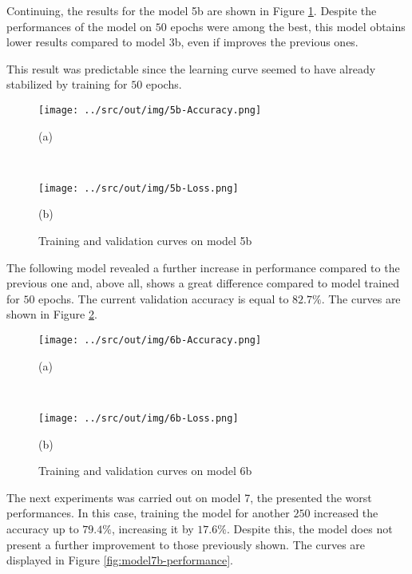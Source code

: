 \documentclass[a4paper,12pt]{article} %
\begin{document}
	Continuing, the results for the model 5b are shown in Figure 
	\ref{fig:model5b-performance}. Despite the performances of the model on 
	$50$ epochs were among the best, this model obtains lower results compared 
	to model 3b, even if improves the previous ones.
	
	This result was predictable since the learning curve seemed to have already 
	stabilized by training for $50$ epochs.
	
	\begin{figure}[htb]
		\begin{minipage}[c]{.49\textwidth}
			\centering
			\texttt{[image: ../src/out/img/5b-Accuracy.png]}
			\caption*{(a)}
		\end{minipage}
		~
		\begin{minipage}[c]{.49\textwidth}
			\centering
			\texttt{[image: ../src/out/img/5b-Loss.png]}
			\caption*{(b)}
		\end{minipage}
		\caption{Training and validation curves on model 5b}
		\label{fig:model5b-performance}
	\end{figure}
	
	The following model revealed a further increase in performance compared to 
	the previous one and, above all, shows a great difference compared to model 
	trained for $50$ epochs. The current validation accuracy is equal to 
	$82.7\%$. The curves are shown in Figure \ref{fig:model6b-performance}.
	
	\begin{figure}[htb]
		\begin{minipage}[c]{.49\textwidth}
			\centering
			\texttt{[image: ../src/out/img/6b-Accuracy.png]}
			\caption*{(a)}
		\end{minipage}
		~
		\begin{minipage}[c]{.49\textwidth}
			\centering
			\texttt{[image: ../src/out/img/6b-Loss.png]}
			\caption*{(b)}
		\end{minipage}
		\caption{Training and validation curves on model 6b}
		\label{fig:model6b-performance}
	\end{figure}

	The next experiments was carried out on model 7, the presented the worst 
	performances. In this case, training the model for another $250$ increased 
	the accuracy up to $79.4\%$, increasing it by $17.6\%$. Despite this, the 
	model does not present a further improvement to those previously shown.
	The curves are displayed in Figure \ref{fig:model7b-performance}.
	
\end{document}
